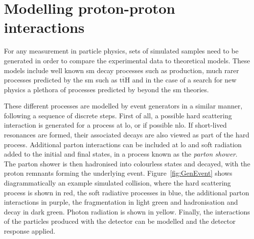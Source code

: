 \chapter{Modelling proton-proton interactions}
\label{ch:MC}

For any measurement in particle physics, sets of simulated samples need to be generated in order to compare the experimental data to theoretical models.  
These models include well known \acrshort{sm} decay processes such as \ttbar{} production, much rarer processes predicted by the \acrshort{sm} such as $\mathrm{t}\overline{\mathrm{t}}\mathrm{H}$ and in the case of a search for new physics a plethora of processes predicted by beyond the \acrshort{sm} theories.

These different processes are modelled by event generators in a similar manner, following a sequence of discrete steps.
First of all, a possible hard scattering interaction is generated for a process at \acrshort{lo}, or if possible \acrshort{nlo}.
If short-lived resonances are formed, their associated decays are also viewed as part of the hard process.
Additional parton interactions can be included at \acrshort{lo} and soft radiation added to the initial and final states, in a process known as the \textit{parton shower}.
The parton shower is then hadronised into colourless states and decayed, with the proton remnants forming the underlying event.
Figure~\ref{fig:GenEvent} shows diagrammatically an example simulated collision, where the hard scattering process is shown in red, the soft radiative processes in blue, the additional parton interactions in purple, the fragmentation in light green and hadronisation and decay in dark green.
Photon radiation is shown in yellow.
Finally, the interactions of the particles produced with the detector can be modelled and the detector response applied.
